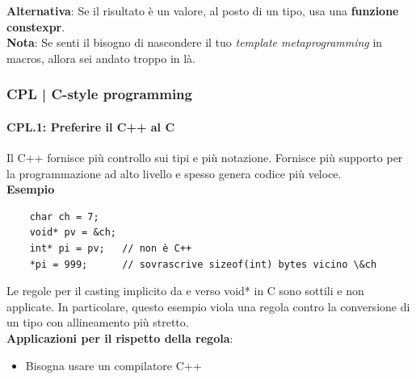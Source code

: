 \textsf{\small \textbf{Alternativa}: Se il risultato è un valore, al posto di un tipo, usa una \textbf{funzione constexpr}.} \\

\textsf{\small \textbf{Nota}: Se senti il bisogno di nascondere il tuo \emph{template metaprogramming} in macros, allora sei andato troppo in là.} \\

\break


\subsubsection{CPL | C-style programming}

\paragraph{CPL.1: Preferire il C++ al C}

\textsf{\small Il C++ fornisce più controllo sui tipi e più notazione. Fornisce più supporto per la programmazione ad alto livello e spesso genera codice più veloce.} \\

\textsf{\small \textbf{Esempio} }

\begin{lstlisting}
	char ch = 7;
	void* pv = &ch;
	int* pi = pv;   // non è C++
	*pi = 999;      // sovrascrive sizeof(int) bytes vicino \&ch
\end{lstlisting}

\textsf{\small Le regole per il casting implicito da e verso void* in C sono sottili e non applicate. In particolare, questo esempio viola una regola contro la conversione di un tipo con allineamento più stretto.} \\ %

\textsf{\small \textbf{Applicazioni per il rispetto della regola}: }

\begin{itemize}
	\item \textsf{\small Bisogna usare un compilatore C++}
\end{itemize}

\break


